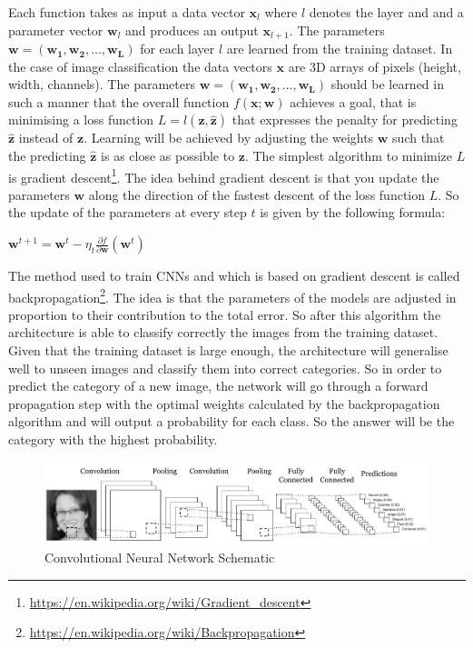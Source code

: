 Each function takes as input a data vector $\mathbf{x}_l$ where $l$ denotes the layer and and a parameter vector $\mathbf{w}_{l}$ and produces an output $\mathbf{x}_{l+1}$. The parameters $\mathbf{w} = (\mathbf{w_{1}, \mathbf{w}_{2},..., \mathbf{w}_{L}})$ for each layer $l$ are learned from the training dataset. In the case of image classification the data vectors $\mathbf{x}$ are 3D arrays of pixels (height, width, channels). The parameters $\mathbf{w} = (\mathbf{w_{1}, \mathbf{w}_{2},..., \mathbf{w}_{L}})$ should be learned in such a manner that the overall function $f(\mathbf{x;w})$ achieves a goal, that is minimising a loss function $L = l(\mathbf{z},\hat{\mathbf{z}})$ that expresses the penalty for predicting $\hat{\mathbf{z}}$ instead of $\mathbf{z}$. Learning will be achieved by adjusting the weights $\mathbf{w}$ such that the predicting $\hat{\mathbf{z}}$ is as close as possible to $\mathbf{z}$. The simplest algorithm to minimize $L$ is gradient descent\footnote{\url{https://en.wikipedia.org/wiki/Gradient_descent}}. The idea behind gradient descent is that you update the parameters $\mathbf{w}$ along the direction of the fastest descent of the loss function $L$. So the update of the parameters at every step $t$ is given by the following formula: 
\begin{center}
$\mathbf{w}^{t+1} = \mathbf{w}^{t} - \eta_{t}\frac{\partial f}{\partial \mathbf{w}}(\mathbf{w}^{t})$ \\
\end{center}

The method used to train CNNs and which is based on gradient descent is called backpropagation\footnote{\url{https://en.wikipedia.org/wiki/Backpropagation}}. The idea is that the parameters of the models are adjusted in proportion to their contribution to the total error. So after this algorithm the architecture is able to classify correctly the images from the training dataset. Given that the training dataset is large enough, the architecture will generalise well to unseen images and classify them into correct categories. So in order to predict the category of a new image, the network will go through a forward propagation step with the optimal weights calculated by the backpropagation algorithm and will output a probability for each class. So the answer will be the category with the highest probability. 

\begin{figure}[t]
    \begin{center}
    \includegraphics[width=1.0\textwidth]{images/CNN.pdf}
    \end{center}
    \caption{Convolutional Neural Network Schematic} \label{fig:CNN}
\end{figure}

